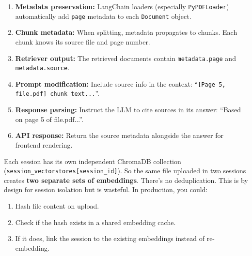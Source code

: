 \documentclass[12pt,a4paper]{article}
\begin{document}
\begin{interviewbox}
\end{interviewbox}
\begin{answerbox}
\begin{enumerate}
  \item \textbf{Metadata preservation:} LangChain loaders (especially \texttt{PyPDFLoader}) automatically add \texttt{page} metadata to each \texttt{Document} object.
  \item \textbf{Chunk metadata:} When splitting, metadata propagates to chunks. Each chunk knows its source file and page number.
  \item \textbf{Retriever output:} The retrieved documents contain \texttt{metadata.page} and \texttt{metadata.source}.
  \item \textbf{Prompt modification:} Include source info in the context: ``\texttt{[Page 5, file.pdf] chunk text...}''.
  \item \textbf{Response parsing:} Instruct the LLM to cite sources in its answer: ``Based on page 5 of file.pdf...''.
  \item \textbf{API response:} Return the source metadata alongside the answer for frontend rendering.
\end{enumerate}
\end{answerbox}

\begin{interviewbox}
\end{interviewbox}
\begin{answerbox}
Each session has its own independent ChromaDB collection (\texttt{session\_vectorstores[session\_id]}). So the same file uploaded in two sessions creates \textbf{two separate sets of embeddings}. There's no deduplication. This is by design for session isolation but is wasteful. In production, you could:
\begin{enumerate}
  \item Hash file content on upload.
  \item Check if the hash exists in a shared embedding cache.
  \item If it does, link the session to the existing embeddings instead of re-embedding.
\end{enumerate}
\end{answerbox}
\end{document}
